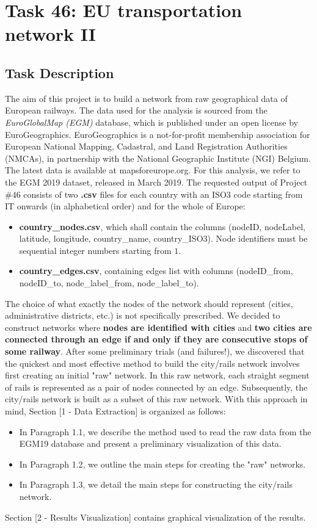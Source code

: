 \chapter{Task 46: EU transportation network II}
\section{Task Description}
The aim of this project is to build a network from raw geographical data of European railways.
\medskip \newline
The data used for the analysis is sourced from the \textit{EuroGlobalMap (EGM)} database, which is published under an open license by EuroGeographics. EuroGeographics is a not-for-profit membership association for European National Mapping, Cadastral, and Land Registration Authorities (NMCAs), in partnership with the National Geographic Institute (NGI) Belgium. The latest data is available at mapsforeurope.org. For this analysis, we refer to the EGM 2019 dataset, released in March 2019.
\medskip \newline
The requested output of Project \#46 consists of two \textbf{.csv} files for each country with an ISO3 code starting from IT onwards (in alphabetical order) and for the whole of Europe:
\begin{itemize}
    \item \textbf{country\_nodes.csv}, which shall contain the columns (nodeID, nodeLabel, latitude, longitude, country\_name, country\_ISO3). Node identifiers must be sequential integer numbers starting from $1$.
    \item \textbf{country\_edges.csv}, containing edges list with columns (nodeID\_from, nodeID\_to, node\_label\_from, node\_label\_to).
\end{itemize}
The choice of what exactly the nodes of the network should represent (cities, administrative districts, etc.) is not specifically prescribed. We decided to construct networks where \textbf{nodes are identified with cities} and \textbf{two cities are connected through an edge if and only if they are consecutive stops of some railway}. After some preliminary trials (and failures!), we discovered that the quickest and most effective method to build the city/rails network involves first creating an initial "raw" network. In this raw network, each straight segment of rails is represented as a pair of nodes connected by an edge. Subsequently, the city/rails network is built as a subset of this raw network. 
\medskip \newline
With this approach in mind, Section [1 - Data Extraction] is organized as follows:
\begin{itemize}
\item In Paragraph 1.1, we describe the method used to read the raw data from the EGM19 database and present a preliminary visualization of this data.
\item In Paragraph 1.2, we outline the main steps for creating the "raw" networks.
\item In Paragraph 1.3, we detail the main steps for constructing the city/rails network.
\end{itemize}
\noindent Section [$2$ - Results Visualization] contains graphical visualization of the results.
